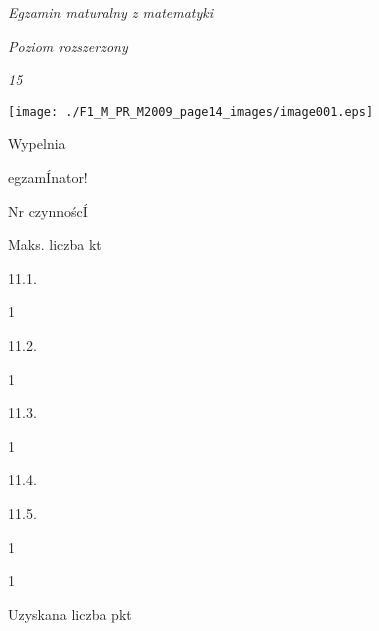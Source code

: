 \documentclass[a4paper,12pt]{article}
\begin{document}
{\it Egzamin maturalny z matematyki}

{\it Poziom rozszerzony}

{\it 15}
\begin{center}
\texttt{[image: ./F1\_M\_PR\_M2009\_page14\_images/image001.eps]}
\end{center}
Wypelnia

egzamÍnator!

Nr czynnoścÍ

Maks. liczba kt

11.1.

1

11.2.

1

11.3.

1

11.4.

11.5.

1

1

Uzyskana liczba pkt
\end{document}
